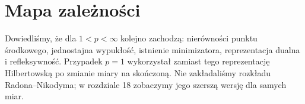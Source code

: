 \section{Mapa zależności}
Dowiedliśmy, że dla $1<p<\infty$ kolejno zachodzą:
nierówności punktu środkowego, jednostajna wypukłość,
istnienie minimizatora, reprezentacja dualna i
refleksywność. Przypadek $p=1$ wykorzystał zamiast tego
reprezentację Hilbertowską po zmianie miary na skończoną.
Nie zakładaliśmy rozkładu Radona--Nikodyma; w rozdziale 18
zobaczymy jego szerszą wersję dla samych miar.
